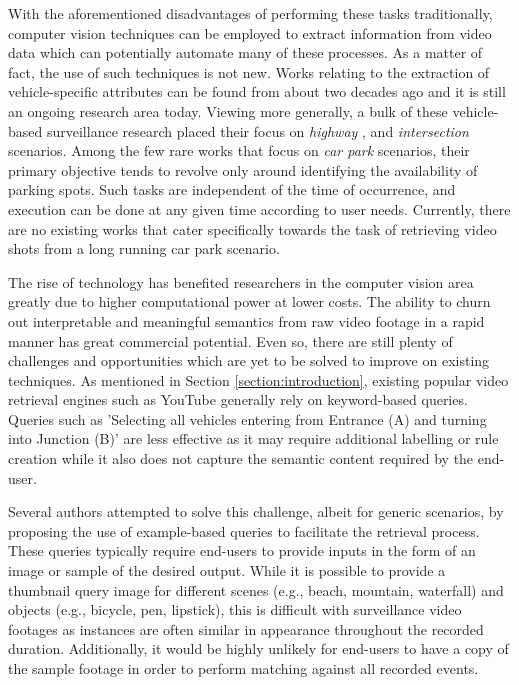 With the aforementioned disadvantages of performing these tasks traditionally, computer vision techniques can be employed to extract information from video data which can potentially automate many of these processes. As a matter of fact, the use of such techniques is not new. %
Works relating to the extraction of vehicle-specific attributes can be found from about two decades ago and it is still an ongoing research area today. Viewing more generally, a bulk of these vehicle-based surveillance research placed their focus on \textit{highway} \cite{yu2017improved, cao2016vehicle, arya2016real, liu2016highway, al2016adaptive}, and  \textit{intersection} \cite{meng2017traffic, choong2017modeling, ren2018learning} scenarios. Among the few rare works \cite{shi2017study, marmol2016quickspot, ling2017identifying} that focus on \emph{car park} scenarios, their primary objective tends to revolve only around identifying the availability of parking spots. Such tasks are independent of the time of occurrence, and execution can be done at any given time according to user needs. Currently, there are no existing works that cater specifically towards the task of retrieving video shots from a long running car park scenario.


The rise of technology has benefited researchers in the computer vision area greatly due to higher computational power at lower costs. The ability to churn out interpretable and meaningful semantics from raw video footage in a rapid manner has great commercial potential. Even so, there are still plenty of challenges and opportunities which are yet to be solved to improve on existing techniques. As mentioned in Section \ref{section:introduction}, existing popular video retrieval engines such as YouTube generally rely on keyword-based queries. Queries such as 'Selecting all vehicles entering from Entrance (A) and turning into Junction (B)' are less effective as it may require additional labelling or rule creation while it also does not capture the semantic content required by the end-user.

Several authors attempted to solve this challenge,
albeit for generic scenarios,
by proposing the use of example-based queries \cite{zhang2017car, liu2016large, castanon2016retrieval} to facilitate the retrieval process.
These queries typically require end-users to provide inputs in the form of an image or sample of the desired output. While it is possible to provide a thumbnail query image for different scenes (e.g., beach, mountain, waterfall) and objects (e.g., bicycle, pen, lipstick), this is difficult with surveillance video footages as instances are often similar in appearance throughout the recorded duration. Additionally, it would be highly unlikely for end-users to have a copy of the sample footage in order to perform matching against all recorded events.

